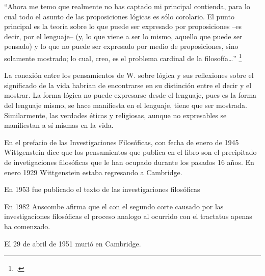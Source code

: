 \documentclass[../main.tex]{subfiles}
\begin{document}
``Ahora me temo que realmente no has captado mi principal contienda, para lo cual todo el asunto de las proposiciones lógicas es sólo corolario. El punto principal es la teoría sobre lo que puede ser expresado por proposiciones --es decir, por el lenguaje-- (y, lo que viene a ser lo mismo, aquello que puede ser pensado) y lo que no puede ser expresado por medio de proposiciones, sino solamente mostrado; lo cual, creo, es el problema cardinal de la filosofía\ldots'' \footcite[p. 161]{IWT}

La conexión entre los pensamientos de W. sobre lógica y sus reflexiones sobre el significado de la vida habrian de encontrarse en su distinción entre el decir y el mostrar. La forma lógica no puede expresarse desde el lenguaje, pues es la forma del lenguaje mismo, se hace manifiesta en el lenguaje, tiene que ser mostrada. Similarmente, las verdades éticas y religiosas, aunque no expresables se manifiestan a sí mismas en la vida. 



En el prefacio de las Investigaciones Filosóficas, con fecha de enero de 1945 Wittgenstein dice que los pensamientos que publica en el libro son el precipitado de invetigaciones filosóficas que le han ocupado durante los pasados 16 años. En enero 1929 Wittgenstein estaba regresando a Cambridge.

En 1953 fue publicado el texto de las investigaciones filosóficas

En 1982 Anscombe afirma que el con el segundo corte causado por las investigaciones filosóficas el proceso analogo al ocurrido con el tractatus apenas ha comenzado.

El 29 de abril de 1951 murió en Cambridge. 
\end{document}
